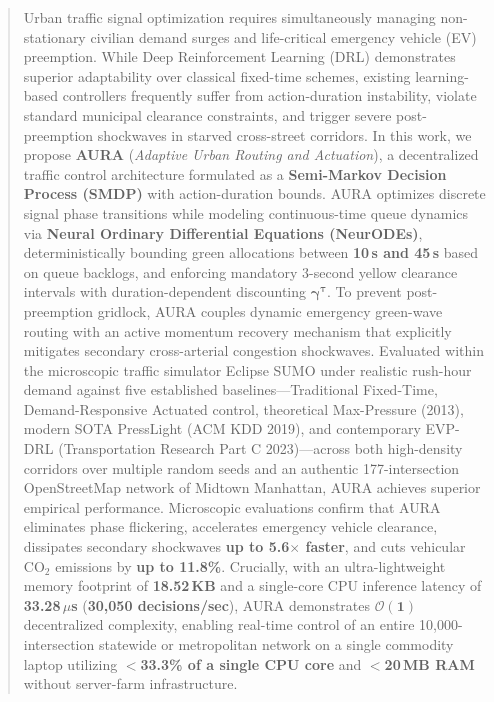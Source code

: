 \documentclass[journal]{IEEEtran}
\begin{document}
\begin{abstract}
Urban traffic signal optimization requires simultaneously managing non-stationary civilian demand surges and life-critical emergency vehicle (EV) preemption. While Deep Reinforcement Learning (DRL) demonstrates superior adaptability over classical fixed-time schemes, existing learning-based controllers frequently suffer from action-duration instability, violate standard municipal clearance constraints, and trigger severe post-preemption shockwaves in starved cross-street corridors. In this work, we propose \textbf{AURA} (\textit{Adaptive Urban Routing and Actuation}), a decentralized traffic control architecture formulated as a \textbf{Semi-Markov Decision Process (SMDP)} with action-duration bounds. AURA optimizes discrete signal phase transitions while modeling continuous-time queue dynamics via \textbf{Neural Ordinary Differential Equations (NeurODEs)}, deterministically bounding green allocations between \textbf{10\,s and 45\,s} based on queue backlogs, and enforcing mandatory 3-second yellow clearance intervals with duration-dependent discounting $\mathbf{\gamma^{\tau}}$. To prevent post-preemption gridlock, AURA couples dynamic emergency green-wave routing with an active momentum recovery mechanism that explicitly mitigates secondary cross-arterial congestion shockwaves. Evaluated within the microscopic traffic simulator Eclipse SUMO under realistic rush-hour demand against five established baselines—Traditional Fixed-Time, Demand-Responsive Actuated control, theoretical Max-Pressure (2013), modern SOTA PressLight (ACM KDD 2019), and contemporary EVP-DRL (Transportation Research Part C 2023)—across both high-density corridors over multiple random seeds and an authentic 177-intersection OpenStreetMap network of Midtown Manhattan, AURA achieves superior empirical performance. Microscopic evaluations confirm that AURA eliminates phase flickering, accelerates emergency vehicle clearance, dissipates secondary shockwaves \textbf{up to 5.6$\times$ faster}, and cuts vehicular $\text{CO}_2$ emissions by \textbf{up to 11.8\%}. Crucially, with an ultra-lightweight memory footprint of \textbf{18.52\,KB} and a single-core CPU inference latency of \textbf{33.28\,$\mu$s} (\textbf{30,050 decisions/sec}), AURA demonstrates $\mathbf{\mathcal{O}(1)}$ decentralized complexity, enabling real-time control of an entire 10,000-intersection statewide or metropolitan network on a single commodity laptop utilizing \textbf{$<$33.3\% of a single CPU core} and \textbf{$<$20\,MB RAM} without server-farm infrastructure.
\end{abstract}
\end{document}
